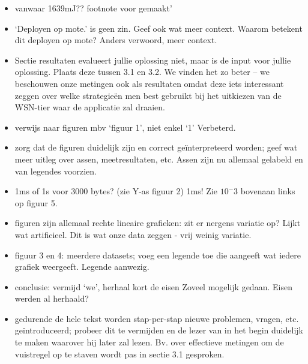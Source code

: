 \documentclass[11pt]{article}
\begin{document}
\begin{itemize}
\item vanwaar 1639mJ?? {\color{red} footnote voor gemaakt'}
\item ‘Deployen op mote.’ is geen zin. Geef ook wat meer context. Waarom betekent dit deployen op mote? {\color{red} Anders verwoord, meer context.}
\item Sectie resultaten evalueert jullie oplossing niet, maar is de input voor jullie oplossing. Plaats deze tussen 3.1 en 3.2. {\color{red} We vinden het zo beter -- we beschouwen onze metingen ook als resultaten omdat deze iets interessant zeggen over welke strategie\"en men best gebruikt bij het uitkiezen van de WSN-tier waar de applicatie zal draaien.}
\item verwijs naar figuren mbv ‘figuur 1’, niet enkel ‘1’ {\color{red} Verbeterd.}
\item zorg dat de figuren duidelijk zijn en correct geïnterpreteerd worden; geef wat meer uitleg over assen, meetresultaten, etc. {\color{red} Assen zijn nu allemaal gelabeld en van legendes voorzien.}
\item 1ms of 1s voor 3000 bytes? (zie Y-as figuur 2) {\color{red} 1ms! Zie $10^-3$ bovenaan links op figuur 5.}
\item figuren zijn allemaal rechte lineaire grafieken: zit er nergens variatie op? Lijkt wat artificieel. {\color{red} Dit is wat onze data zeggen - vrij weinig variatie.}
\item figuur 3 en 4: meerdere datasets; voeg een legende toe die aangeeft wat iedere grafiek weergeeft. {\color{red} Legende aanwezig.}
\item conclusie: vermijd ‘we’, herhaal kort de eisen {\color{red} Zoveel mogelijk gedaan. Eisen werden al herhaald?}

\item gedurende de hele tekst worden stap-per-stap nieuwe problemen, vragen, etc. geïntroduceerd; probeer dit te vermijden en de lezer van in het begin duidelijk te maken waarover hij later zal lezen. Bv. over effectieve metingen om de vuistregel op te staven wordt pas in sectie 3.1 gesproken.
\end{itemize}
\end{document}
